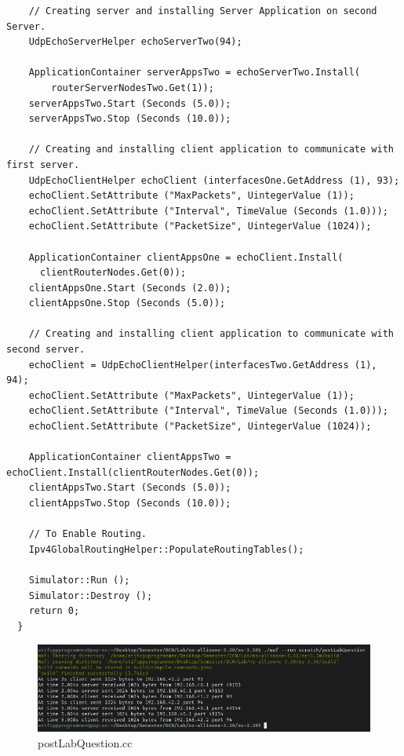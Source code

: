 \documentclass[fullpage]{article}
\begin{document}
\begin{verbatim}
    // Creating server and installing Server Application on second Server.
    UdpEchoServerHelper echoServerTwo(94);

    ApplicationContainer serverAppsTwo = echoServerTwo.Install(
        routerServerNodesTwo.Get(1));
    serverAppsTwo.Start (Seconds (5.0));
    serverAppsTwo.Stop (Seconds (10.0));

    // Creating and installing client application to communicate with first server.
    UdpEchoClientHelper echoClient (interfacesOne.GetAddress (1), 93);
    echoClient.SetAttribute ("MaxPackets", UintegerValue (1));
    echoClient.SetAttribute ("Interval", TimeValue (Seconds (1.0)));
    echoClient.SetAttribute ("PacketSize", UintegerValue (1024));

    ApplicationContainer clientAppsOne = echoClient.Install(
      clientRouterNodes.Get(0));
    clientAppsOne.Start (Seconds (2.0));
    clientAppsOne.Stop (Seconds (5.0));

    // Creating and installing client application to communicate with second server.
    echoClient = UdpEchoClientHelper(interfacesTwo.GetAddress (1), 94);
    echoClient.SetAttribute ("MaxPackets", UintegerValue (1));
    echoClient.SetAttribute ("Interval", TimeValue (Seconds (1.0)));
    echoClient.SetAttribute ("PacketSize", UintegerValue (1024));

    ApplicationContainer clientAppsTwo = echoClient.Install(clientRouterNodes.Get(0));
    clientAppsTwo.Start (Seconds (5.0));
    clientAppsTwo.Stop (Seconds (10.0));

    // To Enable Routing.
    Ipv4GlobalRoutingHelper::PopulateRoutingTables();

    Simulator::Run ();
    Simulator::Destroy ();
    return 0;
  }
\end{verbatim}

\begin{figure}[H]
  \includegraphics[width=\linewidth]{postLabQuestion.png}
  \caption{postLabQuestion.cc}
  \label{fig:output2}
\end{figure}
\end{document}
